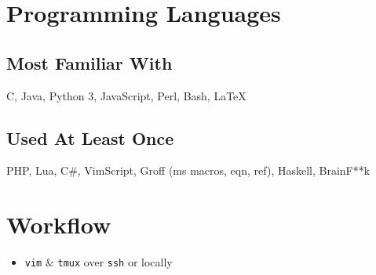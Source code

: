 \documentclass[9pt]{extarticle}
\begin{document}
    \section{Programming Languages}
    \subsection{Most Familiar With}
    C, Java, Python 3, JavaScript, Perl, Bash, \LaTeX
    \subsection{Used At Least Once}
    PHP, Lua, C\#, VimScript, Groff (ms macros, eqn, ref), Haskell, BrainF**k
    \section{Workflow}
    \begin{itemize}
        \item \texttt{vim} \& \texttt{tmux} over \texttt{ssh} or locally
    \end{itemize}
\end{document}
